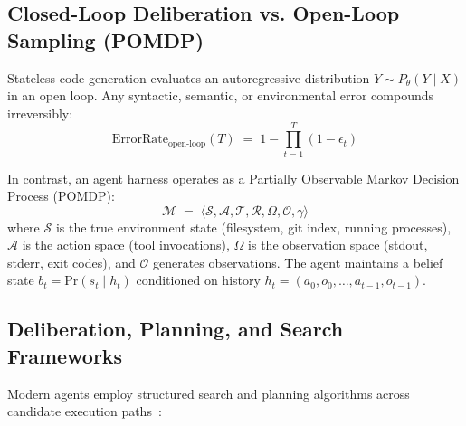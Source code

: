 \documentclass[11pt,a4paper]{article}
\begin{document}
\subsection{Closed-Loop Deliberation vs. Open-Loop Sampling (POMDP)}

Stateless code generation evaluates an autoregressive distribution $Y \sim P_\theta(Y \mid X)$ in an open loop. Any syntactic, semantic, or environmental error compounds irreversibly:
\begin{equation}
\mathrm{ErrorRate}_{\text{open-loop}}(T) \;=\; 1 - \prod_{t=1}^T (1 - \epsilon_t)
\end{equation}

In contrast, an agent harness operates as a Partially Observable Markov Decision Process (POMDP):
\begin{equation}
\mathcal{M} \;=\; \langle \mathcal{S}, \mathcal{A}, \mathcal{T}, \mathcal{R}, \Omega, \mathcal{O}, \gamma \rangle
\end{equation}
where $\mathcal{S}$ is the true environment state (filesystem, git index, running processes), $\mathcal{A}$ is the action space (tool invocations), $\Omega$ is the observation space (stdout, stderr, exit codes), and $\mathcal{O}$ generates observations. The agent maintains a belief state $b_t = \mathrm{Pr}(s_t \mid h_t)$ conditioned on history $h_t = (a_0, o_0, \dots, a_{t-1}, o_{t-1})$.

\subsection{Deliberation, Planning, and Search Frameworks}

Modern agents employ structured search and planning algorithms across candidate execution paths~:
\end{document}
